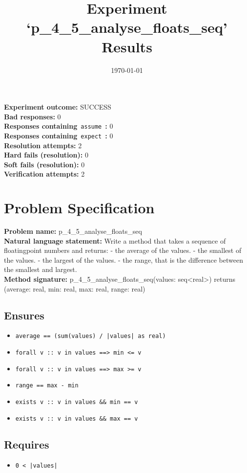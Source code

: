 \documentclass{article}
\begin{document}
\title{Experiment `p\_4\_5\_analyse\_floats\_seq' Results}
\author{\today}
\date{}
\maketitle
\textbf{Experiment outcome: }SUCCESS
\\\textbf{Bad responses: }0
\\\textbf{Responses containing}~\texttt{assume}~\textbf{: }0
\\\textbf{Responses containing}~\texttt{expect}~\textbf{: }0
\\\textbf{Resolution attempts: }2
\\\textbf{Hard fails (resolution): }0
\\\textbf{Soft fails (resolution): }0
\\\textbf{Verification attempts: }2
\section*{Problem Specification}
\textbf{Problem name: }p\_4\_5\_analyse\_floats\_seq
\\\textbf{Natural language statement: }Write a method that takes a sequence of floatingpoint numbers and returns: - the average of the values. - the smallest of the values. - the largest of the values. - the range, that is the difference between the smallest and largest.
\\\textbf{Method signature: }p\_4\_5\_analyse\_floats\_seq(values: seq<real>) returns (average: real, min: real, max: real, range: real)
\subsection*{Ensures}
\begin{itemize}
\item \texttt{average == (sum(values) / |values| as real)}
\item \texttt{forall v :: v in values ==> min <= v}
\item \texttt{forall v :: v in values ==> max >= v}
\item \texttt{range == max - min}
\item \texttt{exists v :: v in values \&\& min == v}
\item \texttt{exists v :: v in values \&\& max == v}
\end{itemize}
\subsection*{Requires}
\begin{itemize}
\item \texttt{0 < |values|}
\end{itemize}
\end{document}
